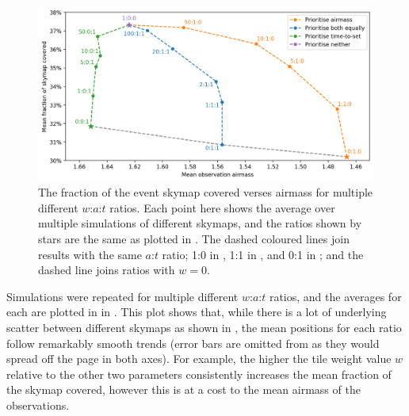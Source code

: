 \begin{colsection}
\begin{figure}[t]
    \begin{center}
        \includegraphics[width=\linewidth]{images/sched_sim2.png}
    \end{center}
    \caption[Scheduler simulation results for different $w$:$a$:$t$ ratios]{
        The fraction of the event skymap covered verses airmass for multiple different $w$:$a$:$t$ ratios. Each point here shows the average over multiple simulations of different skymaps, and the ratios shown by stars are the same as plotted in . The dashed coloured lines join results with the same $a$:$t$ ratio; 1:0 in , 1:1 in , and 0:1 in ; and the  dashed line joins ratios with $w=0$.
    }\label{fig:scheduler_sim_results2}
\end{figure}

Simulations were repeated for multiple different $w$:$a$:$t$ ratios, and the averages for each are plotted in in . This plot shows that, while there is a lot of underlying scatter between different skymaps as shown in , the mean positions for each ratio follow remarkably smooth trends (error bars are omitted from  as they would spread off the page in both axes). For example, the higher the tile weight value $w$ relative to the other two parameters consistently increases the mean fraction of the skymap covered, however this is at a cost to the mean airmass of the observations.


\end{colsection}
